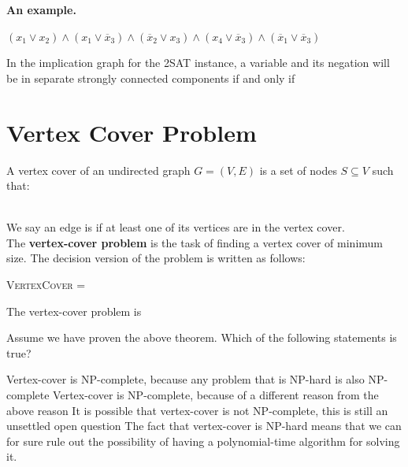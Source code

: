 \documentclass[11  pt]{article}
\begin{document}
\textbf{An example.}

\begin{center}
 {\Large $(x_1 \lor x_2) \land (x_1 \lor \overline{x}_3) \land (\overline{x}_2 \lor x_3) \land (x_4 \lor \overline{x}_3) \land (\overline{x}_1 \lor \overline{x}_3)$}
 \end{center}
\vs{4cm}

\newpage
\begin{theorem}
	In the implication graph for the 2SAT instance, a variable and its negation will be in separate strongly connected components if and only if %
\end{theorem}

\newpage

	\section{Vertex Cover Problem}
A vertex cover of an undirected graph $G = (V,E)$ is a set of nodes $S \subseteq V$ such that:\\ \\


\vs{2cm}

We say an edge is  if at least one of its vertices are in the vertex cover. \\

The \textbf{vertex-cover problem} is the task of finding a vertex cover of minimum size. The decision version of the problem is written as follows:

\begin{center}
	\textsc{VertexCover} = \phantom{$\langle G,k \rangle \colon $ more more more more more more more more} 
\end{center}		





\newpage
\begin{theorem}
	The vertex-cover problem is 
\end{theorem}
\vs{1cm}
\begin{Qu}
	Assume we have proven the above theorem. Which of the following statements is true?
	\begin{itemize}
		\aitem Vertex-cover is NP-complete, because any problem that is NP-hard is also NP-complete
		\bitem Vertex-cover is NP-complete, because of a different reason from the above reason
		\citem It is possible that vertex-cover is not NP-complete, this is still an unsettled open question
		\ditem The fact that vertex-cover is NP-hard means that we can for sure rule out the possibility of having a polynomial-time algorithm for solving it.
	\end{itemize}	
	
\end{Qu}
\end{document}
